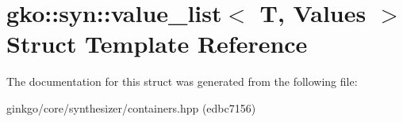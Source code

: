 \hypertarget{structgko_1_1syn_1_1value__list}{}\section{gko\+:\+:syn\+:\+:value\+\_\+list$<$ T, Values $>$ Struct Template Reference}
\label{structgko_1_1syn_1_1value__list}


The documentation for this struct was generated from the following file\+:\begin{DoxyCompactItemize}
\item 
ginkgo/core/synthesizer/containers.\+hpp (edbc7156)\end{DoxyCompactItemize}
